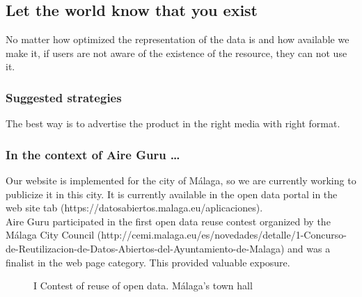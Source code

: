 \subsection{Let the world know that you exist}

No matter how optimized the representation of the data is and how available we make it, if users are not aware
of the existence of the resource, they can not use it.

\subsubsection*{Suggested strategies} 

The best way is to advertise the product in the right media with right format.

\subsubsection*{In the context of Aire Guru \ldots}

Our website is implemented for the city of Málaga, so we are currently working to publicize it in this city.
It is currently available in the open data portal in the web site tab (https://datosabiertos.malaga.eu/aplicaciones). \\

Aire Guru participated in the first open data reuse contest organized by the Málaga City Council (http://cemi.malaga.eu/es/novedades/detalle/1-Concurso-de-Reutilizacion-de-Datos-Abiertos-del-Ayuntamiento-de-Malaga)
and was a finalist in the web page category. This provided valuable exposure.

\begin{figure}[ht]
    \centering
    \hfill
    \caption{I Contest of reuse of open data. Málaga's town hall}
\end{figure}